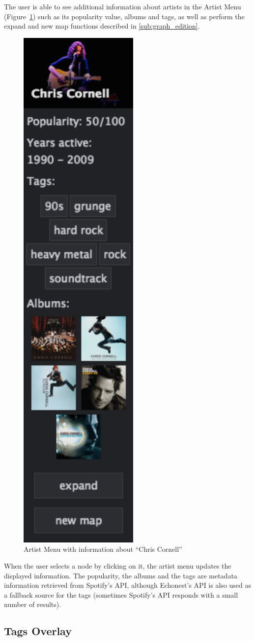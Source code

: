 \documentclass{article}
\begin{document}
      The user is able to see additional information about artists in the Artist Menu (Figure~\ref{fig:artist_menu}) such as its popularity value, albums and tags, as well as perform the expand and new map functions described in \ref{sub:graph_edition}.
      \begin{figure}[th]
        \begin{center}
          \includegraphics[width=0.2\columnwidth]{../report/figures/artist_menu.pdf}
        \end{center}
        \caption{Artist Menu with information about “Chris Cornell”}
        \label{fig:artist_menu}
      \end{figure}
      When the user selects a node by clicking on it, the artist menu updates the displayed information.
      The popularity, the albums and the tags are metadata information retrieved from Spotify’s API, although Echonest’s API is also used as a fallback source for the tags (sometimes Spotify’s API responds with a small number of results).

    \subsection{Tags Overlay} %
    \label{sub:tags_overlay}
    
\end{document}
